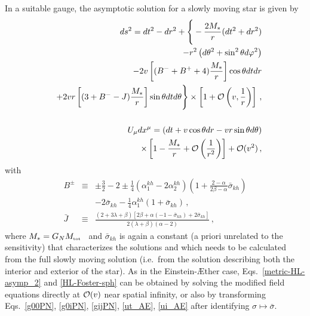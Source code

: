 \documentclass[prd,aps,twocolumn,nofootinbib,showpacs,superscriptaddress]{revtex4-1}
\newcommand\ba{\begin{eqnarray}}
\newcommand\ea{\end{eqnarray}}
\def\m{\mu}
\def\kh{{kh}}
\newcommand{\nn}{\nonumber}
\newcommand{\tot}{{\mbox{\tiny tot}}}
\begin{document}
In a suitable gauge, the asymptotic solution for a slowly moving star is given by 
\ba
\label{metric-HL-asymp_2}
&& ds^2 = dt^2-dr^2+
\Bigg\{-\frac{2M_*}{r} (dt^2+dr^2)  \nn \\ & & - r^2 \left( d\theta^2 +
\sin^2 \theta d\varphi^2 \right) \nn \\ & &   -2 v \left[ (B^{-} +
B^{+}+4) \frac{M_*}{r} \right] \cos \theta dt dr  \nn \\ & & + 2v
r \left[  (3+B^{-}-J) \frac{M_*}{r} \right] \sin\theta dt
d\theta\Bigg\}\times \left[1+{\cal O}\left(v,\frac1r\right)\right]\,,\nn\\ \\
%
&&{U}_{\m} dx^\m =(dt+v \cos\theta
dr  -vr\sin\theta d\theta)\nn \\ &&
\times\left[1-\frac{M_*}{r}+{\cal O}\left(\frac{1}{r^2}\right)\right]+{\cal O}(v^2)\,,
\label{HL-Foster-sph}
\ea
%
with 
\ba
\label{B-HL-strongfield}
B^{\pm} & \equiv & \pm \frac{3}{2} -2 \pm \frac{1}{4} (\alpha^{kh}_1 -
2\alpha^{kh}_2) \left( 1 + \frac{2-\alpha}{2 \beta-\alpha} \bar{\sigma}_{\kh} \right)
\nn \\ & &
- 2 \bar{\sigma}_{\kh} -\frac{1}{4} \alpha^{kh}_1 (1 + \bar{\sigma}_{\kh})\,,\\
\bar{J}& \equiv&
\frac{(2+3\lambda+\beta)[2\beta+\alpha(-1- \bar{\sigma}_{\kh}) + 2 \bar{\sigma}_{\kh}]}{2(\lambda+\beta)(\alpha-2)}\,,
\ea
where $M_*=G_N M_{\tot}$~\cite{Foster:2005fr,Eling:2005zq} and $\bar{\sigma}_{\kh}$ is again a constant (a priori unrelated to the sensitivity) 
that characterizes the solutions and which
needs to be calculated from the full slowly moving solution (i.e.~from the solution describing both the interior and exterior of the star).
As in the Einstein-\AE ther case, Eqs.~\eqref{metric-HL-asymp_2} and \eqref{HL-Foster-sph} can be obtained by solving 
the modified field equations directly at ${\cal O}(v)$ near spatial infinity, or also by transforming
Eqs.~\eqref{g00PN}, \eqref{g0iPN}, \eqref{gijPN}, \eqref{ut_AE}, \eqref{ui_AE} after identifying $\sigma\mapsto \bar \sigma$.
\end{document}
